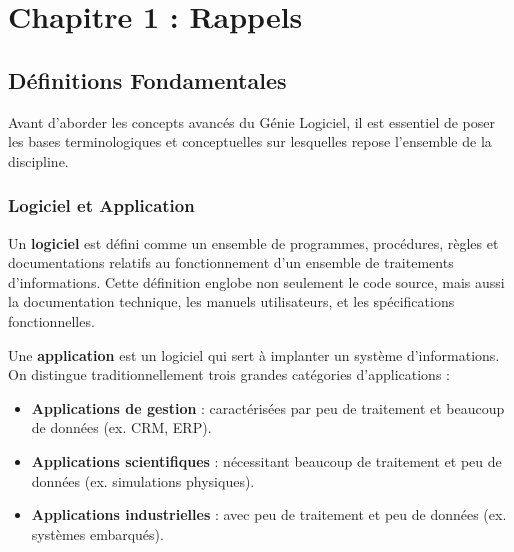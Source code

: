 

\section{Chapitre 1 : Rappels}





\subsection{Définitions Fondamentales}





Avant d'aborder les concepts avancés du Génie Logiciel, il est essentiel de poser les bases terminologiques et conceptuelles sur lesquelles repose l'ensemble de la discipline.





\subsubsection{Logiciel et Application}





Un \textbf{logiciel} est défini comme un ensemble de programmes, procédures, règles et documentations relatifs au fonctionnement d'un ensemble de traitements d'informations. Cette définition englobe non seulement le code source, mais aussi la documentation technique, les manuels utilisateurs, et les spécifications fonctionnelles.





Une \textbf{application} est un logiciel qui sert à implanter un système d'informations. On distingue traditionnellement trois grandes catégories d'applications :





\begin{itemize}


\item \textbf{Applications de gestion} : caractérisées par peu de traitement et beaucoup de données (ex. CRM, ERP).


\item \textbf{Applications scientifiques} : nécessitant beaucoup de traitement et peu de données (ex. simulations physiques).


\item \textbf{Applications industrielles} : avec peu de traitement et peu de données (ex. systèmes embarqués).


\end{itemize}





